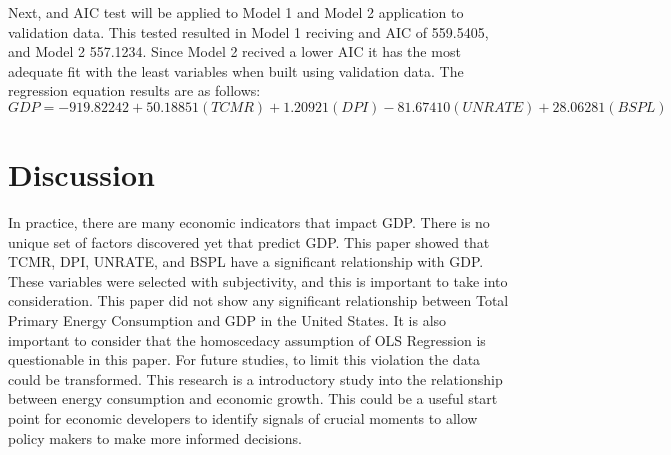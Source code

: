 \documentclass[12pt]{article}
\begin{document}
Next, and AIC test will be applied to Model 1 and Model 2 application to validation data. 
This tested resulted in Model 1 reciving and AIC of 559.5405, and Model 2 557.1234. 
Since Model 2 recived a lower AIC it has the most adequate fit with the least variables when built using validation data. 
The regression equation results are as follows: 
\begin{equation}
  GDP = -919.82242+50.18851(TCMR)+1.20921(DPI)-81.67410(UNRATE)+28.06281(BSPL)
\end{equation}

\section*{Discussion}
In practice, there are many economic indicators that impact GDP. 
There is no unique set of factors discovered yet that predict GDP. 
This paper showed that TCMR, DPI, UNRATE, and BSPL have a significant relationship with GDP.
These variables were selected with subjectivity, and this is important to take into consideration. 
This paper did not show any significant relationship between Total Primary Energy Consumption and GDP in the United States. 
It is also important to consider that the homoscedacy assumption of OLS Regression is questionable in this paper. 
For future studies, to limit this violation the data could be transformed.
This research is a introductory study into the relationship between energy consumption and economic growth. 
This could be a useful start point for economic developers to identify signals of crucial moments to allow policy makers to make more informed decisions. 



\end{document}
